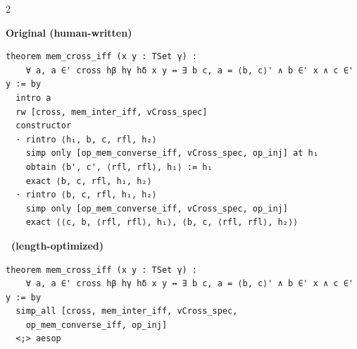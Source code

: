 {
\setlength{\columnsep}{0.2cm}
\begin{paracol}{2}
{
\textbf{Original (human-written)}
\begin{lstlisting}[basicstyle=\tiny\ttfamily]
theorem mem_cross_iff (x y : TSet γ) :
    ∀ a, a ∈' cross hβ hγ hδ x y ↔ ∃ b c, a = ⟨b, c⟩' ∧ b ∈' x ∧ c ∈' y := by
  intro a
  rw [cross, mem_inter_iff, vCross_spec]
  constructor
  · rintro ⟨h₁, b, c, rfl, h₂⟩
    simp only [op_mem_converse_iff, vCross_spec, op_inj] at h₁
    obtain ⟨b', c', ⟨rfl, rfl⟩, h₁⟩ := h₁
    exact ⟨b, c, rfl, h₁, h₂⟩
  · rintro ⟨b, c, rfl, h₁, h₂⟩
    simp only [op_mem_converse_iff, vCross_spec, op_inj]
    exact ⟨⟨c, b, ⟨rfl, rfl⟩, h₁⟩, ⟨b, c, ⟨rfl, rfl⟩, h₂⟩⟩
\end{lstlisting}
}
\switchcolumn
{
\textbf{\ImProver \ (length-optimized)}
\begin{lstlisting}[basicstyle=\tiny\ttfamily]
theorem mem_cross_iff (x y : TSet γ) :
    ∀ a, a ∈' cross hβ hγ hδ x y ↔ ∃ b c, a = ⟨b, c⟩' ∧ b ∈' x ∧ c ∈' y := by
  simp_all [cross, mem_inter_iff, vCross_spec,
    op_mem_converse_iff, op_inj]
  <;> aesop
\end{lstlisting}
}
\end{paracol}
\label{fig:improver2-length-mem-cross}
}







